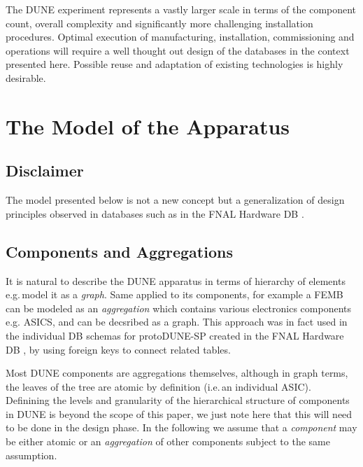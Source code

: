 \documentclass[pdftex,12pt,letter]{article}
\begin{document}
The DUNE experiment represents a vastly larger scale in terms of the component count,
overall complexity and significantly more challenging installation procedures. Optimal execution
of manufacturing, installation, commissioning and operations will require a well thought out design
of the databases in the context presented here. Possible reuse and adaptation of existing technologies
is highly desirable.


\section{The Model of the Apparatus}
\subsection{Disclaimer}

The model presented below is not a new concept but a generalization of design principles
observed in databases such as in the FNAL Hardware DB \cite{hardwareDB}.

\subsection{Components and Aggregations}
\label{graph}
It is natural to describe the DUNE apparatus in terms of hierarchy of elements e.g.\,model it
as a \textit{graph}. Same applied to its components, for example a FEMB can be modeled as an
\textit{aggregation} which contains various electronics components e.g. ASICS, and can be decsribed as a graph.
This approach was in fact used in the individual DB schemas for protoDUNE-SP created in the FNAL
Hardware DB \cite{hardwareDB}, by using foreign keys to connect related tables.


Most DUNE components are aggregations themselves, although in graph terms, the leaves of the tree are atomic
by definition (i.e.\,an individual ASIC).  Definining the levels and granularity of the hierarchical structure of components
in DUNE is beyond the scope of this paper, we just note here that this will need to be done in the design phase.
In the following we assume that a \textit{component} may be either atomic or an \textit{aggregation} of other components
subject to the same assumption.
\end{document}

